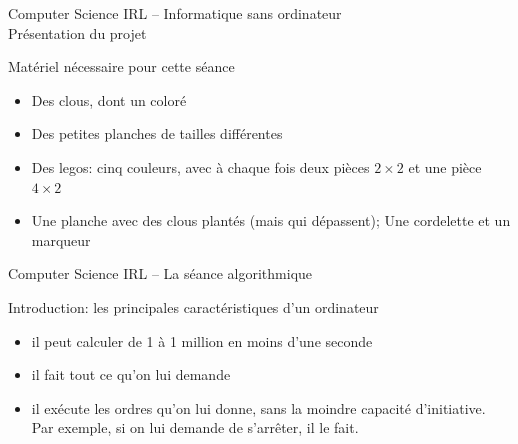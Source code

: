 \documentclass[final,hyperref={pdfpagelabels=false}]{beamer}
\renewenvironment{Coupe}{   }{   }
\renewcommand*{\large}{\fontsize{\resultlargeX}{\resultlargeY}\selectfont}
\begin{document}
\begin{Coupe}
\begin{frame}{Computer Science IRL -- Informatique sans ordinateur\\[-5pt]
  {\large Présentation du projet}}
  \begin{block}{Matériel nécessaire pour cette séance}
    \begin{itemize}
    \item Des clous, dont un coloré
    \item Des petites planches de tailles différentes
    \item Des legos: cinq couleurs, avec à chaque fois deux pièces $2\times2$ et une
      pièce $4\times2$
    \item Une planche avec des clous plantés (mais qui dépassent); Une cordelette et un marqueur
    \end{itemize}
  \end{block}
\end{frame}
\begin{frame}{Computer Science IRL -- La séance algorithmique}
  \begin{block}{Introduction: les principales caractéristiques d'un ordinateur}
    \begin{itemize}
    \item {} il peut calculer de 1 à 1
      million en moins d'une seconde
    \item {} il fait tout ce qu'on lui demande
    \item {} il exécute les
      ordres qu'on lui donne, sans la moindre capacité d'initiative.\\
      Par exemple, si on lui demande de s'arrêter, il le fait.
    \end{itemize}
  \end{block}\vspace{-.5\baselineskip}


\end{frame}
\end{Coupe}
\end{document}
